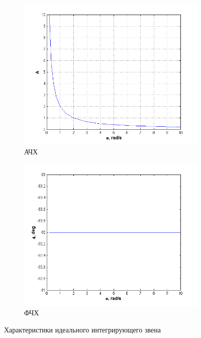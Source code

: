\documentclass[a4paper, 11pt, russian]{article}
\begin{document}
\begin{figure}[ht!]
        \begin{subfigure}[h]{0.48\textwidth}
            \includegraphics[width = \textwidth]{integratingLinkAFR}
            \caption{АЧХ}
        \end{subfigure}
        \hfill
        \begin{subfigure}[h]{0.48\textwidth}
            \includegraphics[width = \textwidth]{integratingLinkPFR}
            \caption{ФЧХ}
        \end{subfigure}
        \caption{Характеристики идеального интегрирующего звена}
    \end{figure}
\end{document}
